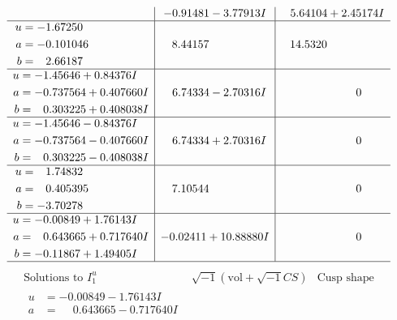 \documentclass[1p]{elsarticle_modified}
\theoremstyle{definition}
\newcommand{\I}{\sqrt{-1}}
\begin{document}
$$\begin{array}{c|c|c}
 & -0.91481 - 3.77913 I & \phantom{-}5.64104 + 2.45174 I \\ \hline\begin{aligned}
u &= -1.67250\phantom{ +0.000000I} \\
a &= -0.101046\phantom{ +0.000000I} \\
b &= \phantom{-}2.66187\phantom{ +0.000000I}\end{aligned}
 & \phantom{-}8.44157\phantom{ +0.000000I} & \phantom{-}14.5320\phantom{ +0.000000I} \\ \hline\begin{aligned}
u &= -1.45646 + 0.84376 I \\
a &= -0.737564 + 0.407660 I \\
b &= \phantom{-}0.303225 + 0.408038 I\end{aligned}
 & \phantom{-}6.74334 - 2.70316 I & \phantom{-0.000000 } 0 \\ \hline\begin{aligned}
u &= -1.45646 - 0.84376 I \\
a &= -0.737564 - 0.407660 I \\
b &= \phantom{-}0.303225 - 0.408038 I\end{aligned}
 & \phantom{-}6.74334 + 2.70316 I & \phantom{-0.000000 } 0 \\ \hline\begin{aligned}
u &= \phantom{-}1.74832\phantom{ +0.000000I} \\
a &= \phantom{-}0.405395\phantom{ +0.000000I} \\
b &= -3.70278\phantom{ +0.000000I}\end{aligned}
 & \phantom{-}7.10544\phantom{ +0.000000I} & \phantom{-0.000000 } 0 \\ \hline\begin{aligned}
u &= -0.00849 + 1.76143 I \\
a &= \phantom{-}0.643665 + 0.717640 I \\
b &= -0.11867 + 1.49405 I\end{aligned}
 & -0.02411 + 10.88880 I & \phantom{-0.000000 } 0\\
 \hline 
 \end{array}$$\newpage$$\begin{array}{c|c|c}  
\text{Solutions to }I^u_{1}& \I (\text{vol} + \sqrt{-1}CS) & \text{Cusp shape}\\
 \hline 
\begin{aligned}
u &= -0.00849 - 1.76143 I \\
a &= \phantom{-}0.643665 - 0.717640 I \\

\end{aligned}
\end{array}$$
\end{document}
